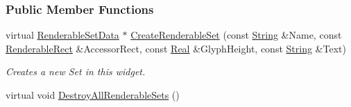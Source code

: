 \subsubsection*{Public Member Functions}
\begin{DoxyCompactItemize}
\item 
virtual \hyperlink{structMezzanine_1_1UI_1_1RenderableSetData}{RenderableSetData} $\ast$ \hyperlink{classMezzanine_1_1UI_1_1TabSet_a8b3fd7e997f0a4cd7c68d915077621a7}{CreateRenderableSet} (const \hyperlink{namespaceMezzanine_acf9fcc130e6ebf08e3d8491aebcf1c86}{String} \&Name, const \hyperlink{structMezzanine_1_1UI_1_1RenderableRect}{RenderableRect} \&AccessorRect, const \hyperlink{namespaceMezzanine_a726731b1a7df72bf3583e4a97282c6f6}{Real} \&GlyphHeight, const \hyperlink{namespaceMezzanine_acf9fcc130e6ebf08e3d8491aebcf1c86}{String} \&Text)
\begin{DoxyCompactList}\small\item\em Creates a new Set in this widget. \item\end{DoxyCompactList}\item 
\hypertarget{classMezzanine_1_1UI_1_1TabSet_a37399125aa416568a72376d0ffd799ed}{
virtual void \hyperlink{classMezzanine_1_1UI_1_1TabSet_a37399125aa416568a72376d0ffd799ed}{DestroyAllRenderableSets} ()}
\label{classMezzanine_1_1UI_1_1TabSet_a37399125aa416568a72376d0ffd799ed}


\end{DoxyCompactItemize}
